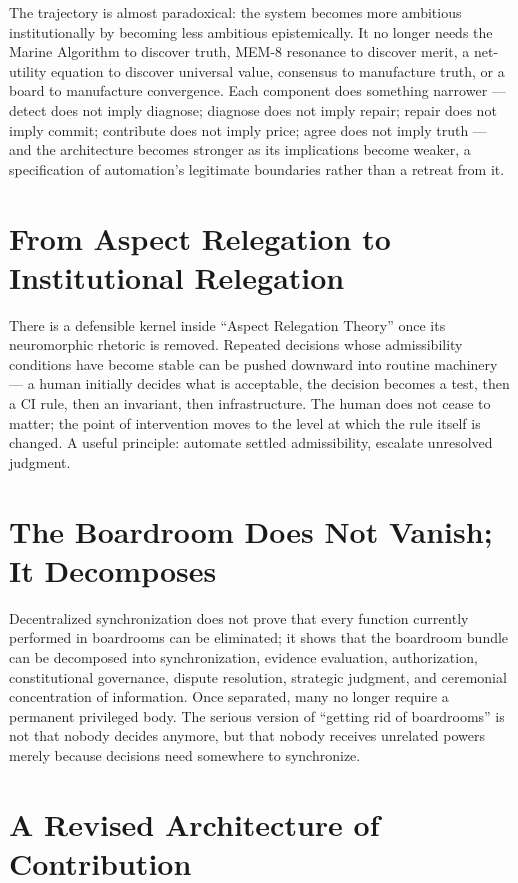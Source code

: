 \documentclass[12pt]{article}
\begin{document}
The trajectory is almost paradoxical: the system becomes more ambitious institutionally by becoming less ambitious epistemically. It no longer needs the Marine Algorithm to discover truth, MEM-8 resonance to discover merit, a net-utility equation to discover universal value, consensus to manufacture truth, or a board to manufacture convergence. Each component does something narrower — detect does not imply diagnose; diagnose does not imply repair; repair does not imply commit; contribute does not imply price; agree does not imply truth — and the architecture becomes stronger as its implications become weaker, a specification of automation's legitimate boundaries rather than a retreat from it.

\section{From Aspect Relegation to Institutional Relegation}

There is a defensible kernel inside ``Aspect Relegation Theory'' once its neuromorphic rhetoric is removed. Repeated decisions whose admissibility conditions have become stable can be pushed downward into routine machinery — a human initially decides what is acceptable, the decision becomes a test, then a CI rule, then an invariant, then infrastructure. The human does not cease to matter; the point of intervention moves to the level at which the rule itself is changed. A useful principle: automate settled admissibility, escalate unresolved judgment.

\section{The Boardroom Does Not Vanish; It Decomposes}

Decentralized synchronization does not prove that every function currently performed in boardrooms can be eliminated; it shows that the boardroom bundle can be decomposed into synchronization, evidence evaluation, authorization, constitutional governance, dispute resolution, strategic judgment, and ceremonial concentration of information. Once separated, many no longer require a permanent privileged body. The serious version of ``getting rid of boardrooms'' is not that nobody decides anymore, but that nobody receives unrelated powers merely because decisions need somewhere to synchronize.

\section{A Revised Architecture of Contribution}
\end{document}
